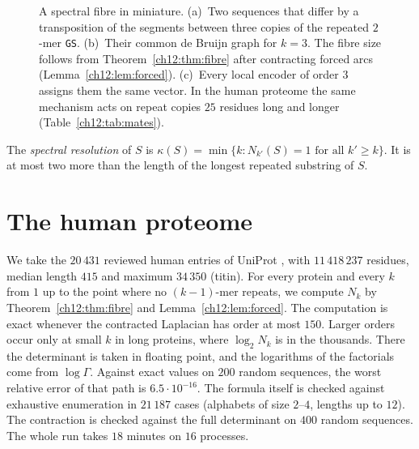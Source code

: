 \begin{figure}[t]
{}
\caption{A spectral fibre in miniature. (a)~Two sequences that differ by a transposition of the segments
between three copies of the repeated $2$-mer \texttt{GS}. (b)~Their common de Bruijn graph for $k=3$. The
fibre size follows from Theorem~\ref{ch12:thm:fibre} after contracting forced arcs (Lemma~\ref{ch12:lem:forced}).
(c)~Every local encoder of order $3$ assigns them the same vector. In the human proteome the same
mechanism acts on repeat copies $25$ residues long and longer (Table~\ref{ch12:tab:mates}).}\label{ch12:fig:toy}
\end{figure}

\begin{definition}\label{ch12:def:kappa}
The \emph{spectral resolution} of $S$ is $\kappa(S)=\min\{k:N_{k'}(S)=1\text{ for all }k'\ge k\}$.
It is at most two more than the length of the longest repeated substring of $S$.
\end{definition}

\section{The human proteome}\label{ch12:sec:proteome}

We take the $20\,431$ reviewed human entries of UniProt \cite{UniProt}, with $11\,418\,237$ residues,
median length $415$ and maximum $34\,350$ (titin). For every protein and every $k$ from $1$ up to the
point where no $(k-1)$-mer repeats, we compute $N_k$ by Theorem~\ref{ch12:thm:fibre} and
Lemma~\ref{ch12:lem:forced}. The computation is exact whenever the contracted Laplacian has order at most
$150$. Larger orders occur only at small $k$ in long proteins, where $\log_2N_k$ is in the thousands.
There the determinant is taken in floating point, and the logarithms of the factorials come from
$\log\Gamma$. Against exact values on $200$ random sequences, the worst relative error of that path
is $6.5\cdot10^{-16}$. The formula itself is checked against exhaustive enumeration in $21\,187$ cases
(alphabets of size $2$--$4$, lengths up to $12$). The contraction is checked against the full
determinant on $400$ random sequences. The whole run takes $18$ minutes on $16$ processes.

